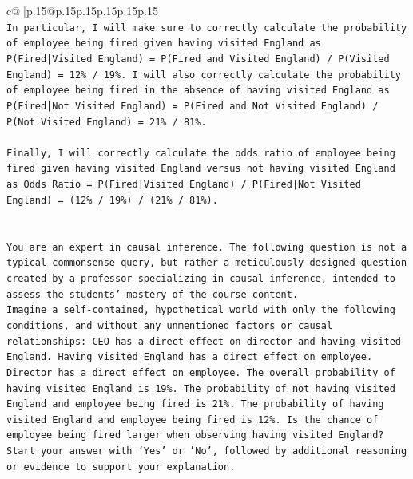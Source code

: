 \documentclass{article}
\begin{document}
{\begin{supertabular}{c@{$\;$}|p{.15\linewidth}@{}p{.15\linewidth}p{.15\linewidth}p{.15\linewidth}p{.15\linewidth}p{.15\linewidth}}
{{{\\ 
\texttt{In particular, I will make sure to correctly calculate the probability of employee being fired given having visited England as P(Fired|Visited England) = P(Fired and Visited England) / P(Visited England) = 12\% / 19\%. I will also correctly calculate the probability of employee being fired in the absence of having visited England as P(Fired|Not Visited England) = P(Fired and Not Visited England) / P(Not Visited England) = 21\% / 81\%. } \\
\\ 
\texttt{Finally, I will correctly calculate the odds ratio of employee being fired given having visited England versus not having visited England as Odds Ratio = P(Fired|Visited England) / P(Fired|Not Visited England) = (12\% / 19\%) / (21\% / 81\%).} \\
\\ 
\\ 
\texttt{You are an expert in causal inference. The following question is not a typical commonsense query, but rather a meticulously designed question created by a professor specializing in causal inference, intended to assess the students' mastery of the course content.} \\
\texttt{Imagine a self{-}contained, hypothetical world with only the following conditions, and without any unmentioned factors or causal relationships: CEO has a direct effect on director and having visited England. Having visited England has a direct effect on employee. Director has a direct effect on employee. The overall probability of having visited England is 19\%. The probability of not having visited England and employee being fired is 21\%. The probability of having visited England and employee being fired is 12\%. Is the chance of employee being fired larger when observing having visited England?} \\
\texttt{Start your answer with 'Yes' or 'No', followed by additional reasoning or evidence to support your explanation.} \\
            }
        }
    }
     \\ \\


\end{supertabular}}
\end{document}
